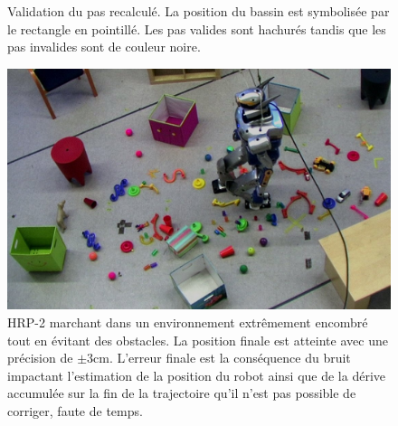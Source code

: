 \begin{figure}[ht!]
\begin{center}
  \end{center}
  \caption{Validation du pas recalculé. La position du bassin est
    symbolisée par le rectangle en pointillé. Les pas valides sont
    hachurés tandis que les pas invalides sont de couleur noire.
    \label{fig:stepvalid}}
\end{figure}


\begin{figure}
  \begin{center}
    \includegraphics[width=\textwidth]{src/chap2-suivi-trajectoire/demo.jpg}
  \end{center}
  \caption{HRP-2 marchant dans un environnement extrêmement encombré
    tout en évitant des obstacles. La position finale est atteinte
    avec une précision de $\pm 3\mathrm{cm}$. L'erreur finale est la
    conséquence du bruit impactant l'estimation de la position du
    robot ainsi que de la dérive accumulée sur la fin de la
    trajectoire qu'il n'est pas possible de corriger, faute de
    temps. \label{fig:scenario}}
\end{figure}


